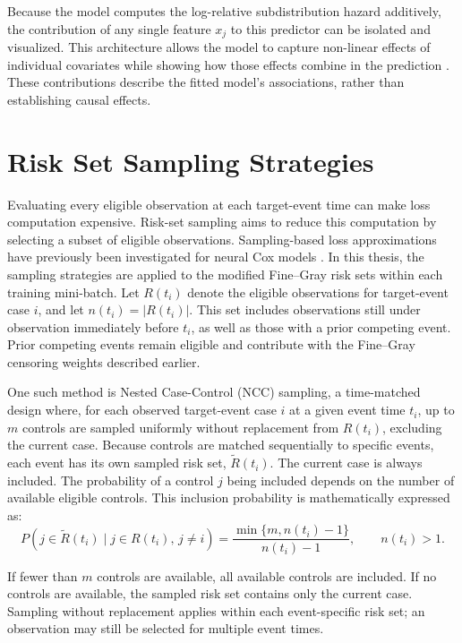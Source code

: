 \documentclass[a4paper,twoside,12pt]{report}
\begin{document}
Because the model computes the log-relative subdistribution hazard additively, the contribution of any single feature $x_j$ to this predictor can be isolated and visualized. This architecture allows the model to capture non-linear effects of individual covariates while showing how those effects combine in the prediction \citep{InterpretableFineGray2025}. These contributions describe the fitted model's associations, rather than establishing causal effects.

\section{Risk Set Sampling Strategies}

Evaluating every eligible observation at each target-event time can make loss computation expensive. Risk-set sampling aims to reduce this computation by selecting a subset of eligible observations. Sampling-based loss approximations have previously been investigated for neural Cox models \citep{kvamme2019}. In this thesis, the sampling strategies are applied to the modified Fine--Gray risk sets within each training mini-batch. Let $R(t_i)$ denote the eligible observations for target-event case $i$, and let $n(t_i)=|R(t_i)|$. This set includes observations still under observation immediately before $t_i$, as well as those with a prior competing event. Prior competing events remain eligible and contribute with the Fine--Gray censoring weights described earlier.

One such method is Nested Case-Control (NCC) sampling, a time-matched design where, for each observed target-event case $i$ at a given event time $t_i$, up to $m$ controls are sampled uniformly without replacement from $R(t_i)$, excluding the current case. Because controls are matched sequentially to specific events, each event has its own sampled risk set, $\tilde{R}(t_i)$. The current case is always included. The probability of a control $j$ being included depends on the number of available eligible controls. This inclusion probability is mathematically expressed as:
\[
P\!\left(j\in\tilde{R}(t_i)\mid j\in R(t_i),\,j\neq i\right)
=
\frac{\min\{m,n(t_i)-1\}}{n(t_i)-1},
\qquad n(t_i)>1.
\]

If fewer than $m$ controls are available, all available controls are included. If no controls are available, the sampled risk set contains only the current case. Sampling without replacement applies within each event-specific risk set; an observation may still be selected for multiple event times.
\end{document}
